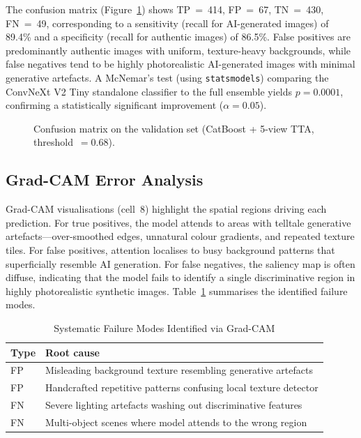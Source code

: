 \documentclass[conference]{IEEEtran}
\begin{document}
The confusion matrix (Figure~\ref{fig:cm}) shows TP~=~414, FP~=~67, TN~=~430,
FN~=~49, corresponding to a sensitivity (recall for AI-generated images) of
89.4\% and a specificity (recall for authentic images) of 86.5\%.  False
positives are predominantly authentic images with uniform, texture-heavy
backgrounds, while false negatives tend to be highly photorealistic AI-generated
images with minimal generative artefacts.  A McNemar's test (using
\texttt{statsmodels}) comparing the ConvNeXt V2 Tiny standalone classifier
to the full ensemble yields $p = 0.0001$, confirming a statistically
significant improvement ($\alpha = 0.05$).

\begin{figure}[t]
  \centering
  \caption{Confusion matrix on the validation set (CatBoost + 5-view TTA,
           threshold~$=0.68$).}
  \label{fig:cm}
\end{figure}

\subsection{Grad-CAM Error Analysis}

Grad-CAM visualisations (cell~8) highlight the spatial regions driving each
prediction.  For true positives, the model attends to areas with telltale
generative artefacts—over-smoothed edges, unnatural colour gradients, and
repeated texture tiles.  For false positives, attention localises to busy
background patterns that superficially resemble AI generation.  For false
negatives, the saliency map is often diffuse, indicating that the model fails
to identify a single discriminative region in highly photorealistic synthetic
images.  Table~\ref{tab:failures} summarises the identified failure modes.

\begin{table}[t]
  \caption{Systematic Failure Modes Identified via Grad-CAM}
  \label{tab:failures}
  \centering
  \begin{tabular}{p{1.3cm}p{5.2cm}}
    \toprule
    \textbf{Type} & \textbf{Root cause} \\
    \midrule
    FP & Misleading background texture resembling generative artefacts \\
    FP & Handcrafted repetitive patterns confusing local texture detector \\
    FN & Severe lighting artefacts washing out discriminative features \\
    FN & Multi-object scenes where model attends to the wrong region \\
    \bottomrule
  \end{tabular}
\end{table}
\end{document}
